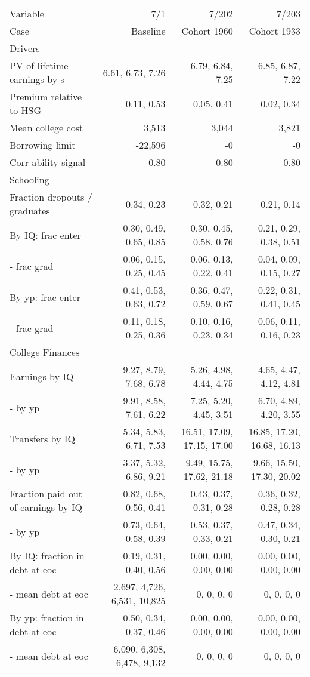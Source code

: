 \begin{tabular}{lrrr}
\hline
Variable & 7/1  & 7/202  & 7/203  \\ 
Case & Baseline  & Cohort 1960  & Cohort 1933  \\ 
Drivers &   &   &   \\ 
PV of lifetime earnings by s & 6.61, 6.73, 7.26  & 6.79, 6.84, 7.25  & 6.85, 6.87, 7.22  \\ 
Premium relative to HSG & 0.11, 0.53  & 0.05, 0.41  & 0.02, 0.34  \\ 
Mean college cost & 3,513  & 3,044  & 3,821  \\ 
Borrowing limit & -22,596  & -0  & -0  \\ 
Corr ability signal & 0.80  & 0.80  & 0.80  \\ 
\hline
Schooling &   &   &   \\ 
Fraction dropouts / graduates & 0.34, 0.23  & 0.32, 0.21  & 0.21, 0.14  \\ 
By IQ: frac enter & 0.30, 0.49, 0.65, 0.85  & 0.30, 0.45, 0.58, 0.76  & 0.21, 0.29, 0.38, 0.51  \\ 
- frac grad & 0.06, 0.15, 0.25, 0.45  & 0.06, 0.13, 0.22, 0.41  & 0.04, 0.09, 0.15, 0.27  \\ 
By yp: frac enter & 0.41, 0.53, 0.63, 0.72  & 0.36, 0.47, 0.59, 0.67  & 0.22, 0.31, 0.41, 0.45  \\ 
- frac grad & 0.11, 0.18, 0.25, 0.36  & 0.10, 0.16, 0.23, 0.34  & 0.06, 0.11, 0.16, 0.23  \\ 
\hline
College Finances &   &   &   \\ 
Earnings by IQ & 9.27, 8.79, 7.68, 6.78  & 5.26, 4.98, 4.44, 4.75  & 4.65, 4.47, 4.12, 4.81  \\ 
- by yp & 9.91, 8.58, 7.61, 6.22  & 7.25, 5.20, 4.45, 3.51  & 6.70, 4.89, 4.20, 3.55  \\ 
Transfers by IQ & 5.34, 5.83, 6.71, 7.53  & 16.51, 17.09, 17.15, 17.00  & 16.85, 17.20, 16.68, 16.13  \\ 
- by yp & 3.37, 5.32, 6.86, 9.21  & 9.49, 15.75, 17.62, 21.18  & 9.66, 15.50, 17.30, 20.02  \\ 
Fraction paid out of earnings by IQ & 0.82, 0.68, 0.56, 0.41  & 0.43, 0.37, 0.31, 0.28  & 0.36, 0.32, 0.28, 0.28  \\ 
- by yp & 0.73, 0.64, 0.58, 0.39  & 0.53, 0.37, 0.33, 0.21  & 0.47, 0.34, 0.30, 0.21  \\ 
By IQ: fraction in debt at eoc & 0.19, 0.31, 0.40, 0.56  & 0.00, 0.00, 0.00, 0.00  & 0.00, 0.00, 0.00, 0.00  \\ 
- mean debt at eoc & 2,697, 4,726, 6,531, 10,825  & 0, 0, 0, 0  & 0, 0, 0, 0  \\ 
By yp: fraction in debt at eoc & 0.50, 0.34, 0.37, 0.46  & 0.00, 0.00, 0.00, 0.00  & 0.00, 0.00, 0.00, 0.00  \\ 
- mean debt at eoc & 6,090, 6,308, 6,478, 9,132  & 0, 0, 0, 0  & 0, 0, 0, 0  \\ 
\hline
\end{tabular}%
